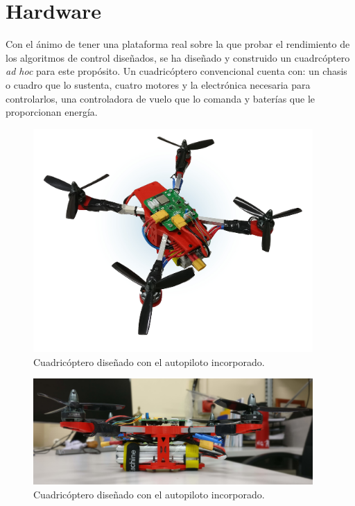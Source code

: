 \chapter{Hardware}

Con el ánimo de tener una plataforma real sobre la que probar el rendimiento de los algoritmos de control diseñados, se ha diseñado y construido un cuadrcóptero \textit{ad hoc} para este propósito. Un cuadricóptero convencional cuenta con: un chasis o cuadro que lo sustenta, cuatro motores y la electrónica necesaria para controlarlos, una controladora de vuelo que lo comanda y baterías que le proporcionan energía.

\begin{figure}[htb!]
	\centering
	\includegraphics[width=0.95\textwidth]{hardware/droneImg}
	\caption{Cuadricóptero diseñado con el autopiloto incorporado. }
	\label{hardware:droneImg}
\end{figure}

\begin{figure}[htb!]
	\centering
	\includegraphics[width=0.95\textwidth]{hardware/Drones_side}
	\caption{Cuadricóptero diseñado con el autopiloto incorporado.}
	\label{hardware:droneImg}
\end{figure}


